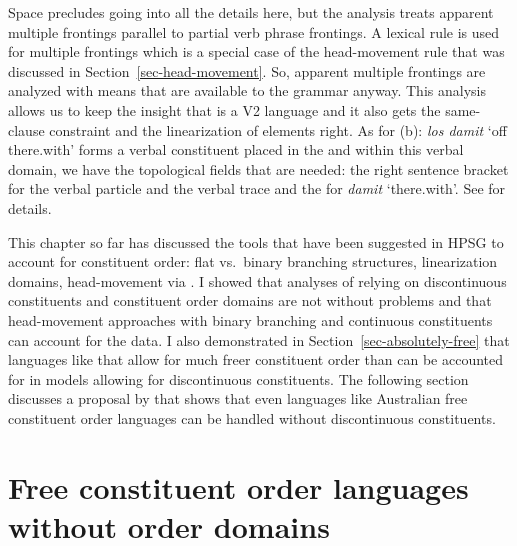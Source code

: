 \documentclass[output=paper,biblatex,babelshorthands,newtxmath,draftmode,colorlinks,citecolor=brown]{langscibook}
\begin{document}
\zl 
Space precludes going into all the details here, but the analysis treats apparent multiple frontings parallel to
partial verb phrase frontings. A lexical rule is used for multiple frontings which is a special case
of the head-movement rule that was discussed in Section~\ref{sec-head-movement}. So, apparent
multiple frontings are analyzed with means that are available to the grammar anyway. This analysis
allows us to keep the insight that  is a V2 language and it also gets the same-clause constraint
and the linearization of elements right. As for (b): \emph{los damit} `off there.with' forms
a verbal constituent placed in the \vf and within this verbal domain, we have the topological fields that are needed:
the right sentence bracket for the verbal particle and the verbal trace and the \nf for
\emph{damit} `there.with'. See  for details.%



This chapter so far has discussed the tools that have been suggested in HPSG to account for constituent
order: flat vs.\ binary branching structures, linearization domains, head-movement via \dsl. I
showed that analyses of  relying on discontinuous constituents and constituent order domains
are not without problems and that head-movement approaches with binary branching and continuous
constituents can account for the data. I also demonstrated in Section~\ref{sec-absolutely-free} that
languages like  that allow for much freer constituent order than  can be accounted
for in models allowing for discontinuous constituents. The following section discusses a proposal by \citet{Bender2008a} that shows that even
languages like Australian free constituent order languages can be handled without discontinuous constituents.

\section{Free constituent order languages without order domains}
\label{sec-free-without-domains}
\end{document}

